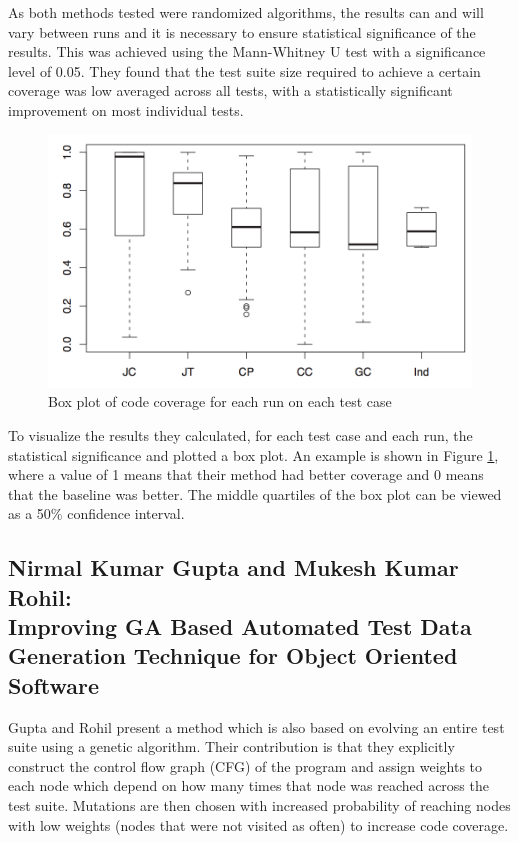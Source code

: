 \documentclass{sig-alternate-05-2015}
\begin{document}
As both methods tested were randomized algorithms, the results can and will
vary between runs and it is necessary to ensure statistical significance of the
results. This was achieved using the Mann-Whitney U test with a significance
level of 0.05. They found that the test suite size required to achieve a
certain coverage was low averaged across all tests, with a statistically
significant improvement on most individual tests.

\begin{figure}
\center
\includegraphics[scale=0.25]{plot.png}
\caption{Box plot of code coverage for each run on each test case}
\label{wts-plot}
\end{figure}

To visualize the results they calculated, for each test case and each run, the
statistical significance and plotted a box plot. An example is shown in Figure
\ref{wts-plot}, where a value of 1 means that their method had better coverage
and 0 means that the baseline was better. The middle quartiles of the box plot
can be viewed as a 50\% confidence interval.

\subsection{Nirmal Kumar Gupta and Mukesh Kumar Rohil: \\Improving GA Based
            Automated Test Data Generation Technique for Object Oriented
            Software}

Gupta and Rohil \cite{gupta} present a method which is also based on evolving
an entire test
suite using a genetic algorithm. Their contribution is that they explicitly
construct the control flow graph (CFG) of the program and assign weights to
each node which depend on how many times that node was reached across the test
suite. Mutations are then chosen with increased probability of reaching nodes
with low weights (nodes that were not visited as often) to increase code
coverage.
\end{document}
